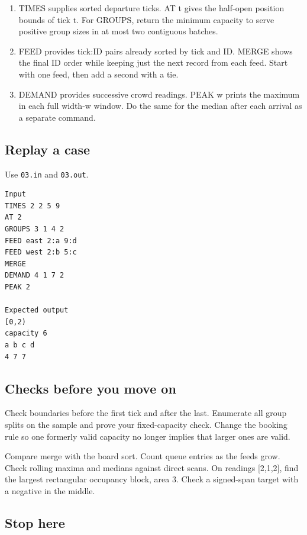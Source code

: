 \documentclass[11pt,letterpaper]{article}
\begin{document}
\begin{enumerate}
\item TIMES supplies sorted departure ticks. AT t gives the half-open position bounds of tick t. For GROUPS, return the minimum capacity to serve positive group sizes in at most two contiguous batches.
\item FEED provides tick:ID pairs already sorted by tick and ID. MERGE shows the final ID order while keeping just the next record from each feed. Start with one feed, then add a second with a tie.
\item DEMAND provides successive crowd readings. PEAK w prints the maximum in each full width-w window. Do the same for the median after each arrival as a separate command.
\end{enumerate}

\subsection*{Replay a case}

Use \texttt{03.in} and \texttt{03.out}.

\begin{samepage}
\small
\begin{verbatim}
Input
TIMES 2 2 5 9
AT 2
GROUPS 3 1 4 2
FEED east 2:a 9:d
FEED west 2:b 5:c
MERGE
DEMAND 4 1 7 2
PEAK 2

Expected output
[0,2)
capacity 6
a b c d
4 7 7
\end{verbatim}
\end{samepage}

\subsection*{Checks before you move on}

Check boundaries before the first tick and after the last. Enumerate all group splits on the sample and prove your fixed-capacity check. Change the booking rule so one formerly valid capacity no longer implies that larger ones are valid.

Compare merge with the board sort. Count queue entries as the feeds grow. Check rolling maxima and medians against direct scans. On readings [2,1,2], find the largest rectangular occupancy block, area 3. Check a signed-span target with a negative in the middle.

\subsection*{Stop here}
\end{document}
